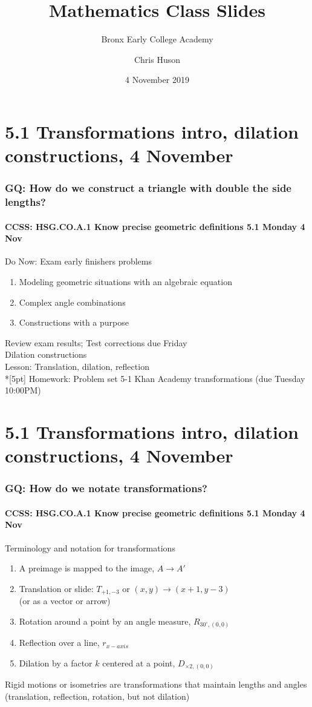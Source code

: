 \documentclass{beamer}
\title{Mathematics Class Slides}
\subtitle{Bronx Early College Academy}
\author{Chris Huson}
\date{4 November 2019}
\begin{document}
\frame{\titlepage}
\section[Outline]{}
\frame{\tableofcontents}


\section{5.1 Transformations intro, dilation constructions, 4 November}
  \frame
  {
    \frametitle{GQ: How do we construct a triangle with double the side lengths?}
    \framesubtitle{CCSS: HSG.CO.A.1 Know precise geometric definitions \hfill \alert{5.1 Monday 4 Nov}}

    \begin{block}{Do Now: Exam early finishers problems}
    \begin{enumerate}
      \item Modeling geometric situations with an algebraic equation
      \item Complex angle combinations
      \item Constructions with a purpose
    \end{enumerate}
    \end{block}
    Review exam results; Test corrections due \alert{Friday}\\
    Dilation constructions \\
    Lesson: Translation, dilation, reflection \\*[5pt]
    Homework: Problem set 5-1 Khan Academy transformations (due Tuesday 10:00PM)
  }

  \section{5.1 Transformations intro, dilation constructions, 4 November}
  \frame
  {
    \frametitle{GQ: How do we notate transformations?}
    \framesubtitle{CCSS: HSG.CO.A.1 Know precise geometric definitions \hfill \alert{5.1 Monday 4 Nov}}

    \begin{block}{Terminology and notation for transformations}
    \begin{enumerate}
      \item A preimage is mapped to the image, $A \rightarrow A'$
      \item Translation or slide: $T_{+1,-3}$ or $(x,y) \rightarrow (x+1,y-3)$ \\ 
      (or as a vector or arrow)
      \item Rotation around a point by an angle measure, $R_{30^\circ, (0,0)}$
      \item Reflection over a line, $r_{x-axis}$
      \item Dilation by a factor $k$ centered at a point, $D_{\times 2, (0,0)}$
    \end{enumerate}
    \end{block}
    Rigid motions or isometries are transformations that maintain lengths and angles (translation, reflection, rotation, but not dilation)
  }
\end{document}
